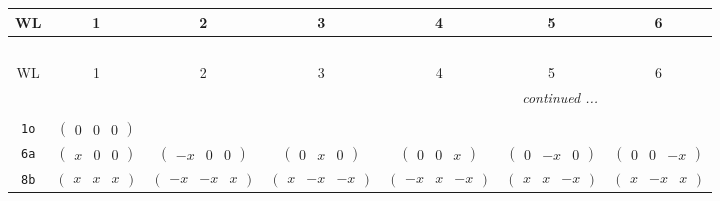 \documentclass[fleqn,9pt,landscape]{jsarticle}
\begin{document}
\begin{center}
\renewcommand{\arraystretch}{1.2}
\begin{longtable}{ccccccc}
 \hline \hline
WL & 1 & 2 & 3 & 4 & 5 & 6 \\ \hline \endfirsthead

\multicolumn{6}{l}{\tablename\ \thetable{}} \\
 \hline \hline
WL & 1 & 2 & 3 & 4 & 5 & 6 \\ \hline \endhead

 \hline \hline
\multicolumn{6}{r}{\footnotesize\it continued ...} \\ \endfoot

 \hline \hline
\multicolumn{6}{r}{} \\ \endlastfoot

{\tt 1o} & $ \begin{pmatrix} 0 & 0 & 0 \end{pmatrix} $ & $  $ & $  $ & $  $ & $  $ & $  $ \\ \hline
{\tt 6a} & $ \begin{pmatrix} x & 0 & 0 \end{pmatrix} $ & $ \begin{pmatrix} - x & 0 & 0 \end{pmatrix} $ & $ \begin{pmatrix} 0 & x & 0 \end{pmatrix} $ & $ \begin{pmatrix} 0 & 0 & x \end{pmatrix} $ & $ \begin{pmatrix} 0 & - x & 0 \end{pmatrix} $ & $ \begin{pmatrix} 0 & 0 & - x \end{pmatrix} $ \\ \hline
{\tt 8b} & $ \begin{pmatrix} x & x & x \end{pmatrix} $ & $ \begin{pmatrix} - x & - x & x \end{pmatrix} $ & $ \begin{pmatrix} x & - x & - x \end{pmatrix} $ & $ \begin{pmatrix} - x & x & - x \end{pmatrix} $ & $ \begin{pmatrix} x & x & - x \end{pmatrix} $ & $ \begin{pmatrix} x & - x & x \end{pmatrix} $ \\

\end{longtable}
\end{center}
\end{document}
